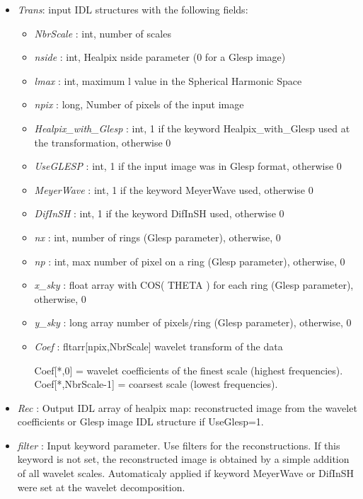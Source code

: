 \begin{itemize}
\item {\em Trans}: input IDL structures with the following fields:  
\begin{itemize}
\item {\em NbrScale} : int, number of scales 
\item {\em nside} : int, Healpix nside parameter (0 for a Glesp image)
\item {\em lmax} : int, maximum l value in the Spherical Harmonic Space
\item {\em npix} : long, Number of pixels of the input image
\item {\em Healpix\_with\_Glesp} : int, 1 if the keyword Healpix\_with\_Glesp used at the transformation, otherwise 0
\item {\em UseGLESP} : int, 1 if the input image was in Glesp format, otherwise 0
\item {\em MeyerWave} : int, 1 if the keyword MeyerWave used, otherwise 0
\item {\em DifInSH} : int, 1 if the keyword DifInSH used, otherwise 0
\item {\em nx} : int, number of rings (Glesp parameter), otherwise, 0
\item {\em np} : int, max number of pixel on a ring (Glesp parameter), otherwise, 0
\item {\em x\_sky} : float array with COS( THETA ) for each ring (Glesp parameter), otherwise, 0
\item {\em y\_sky} : long array number of pixels/ring (Glesp parameter), otherwise, 0
\item {\em Coef} : fltarr[npix,NbrScale] wavelet transform of the data
\begin{center}
Coef[*,0] = wavelet coefficients of the finest scale (highest frequencies).\\
Coef[*,NbrScale-1] = coarsest scale (lowest frequencies). 
\end{center} 
\end{itemize}
\item {\em Rec} : Output IDL array of healpix map: reconstructed image from the wavelet coefficients or Glesp image IDL structure if UseGlesp=1. 
\item {\em filter} : Input keyword parameter. Use filters for the reconstructions. If this keyword is not set, the reconstructed image is obtained 
by a simple addition of all wavelet scales. Automaticaly applied if keyword MeyerWave or DifInSH were set at the wavelet decomposition.
\end{itemize}

